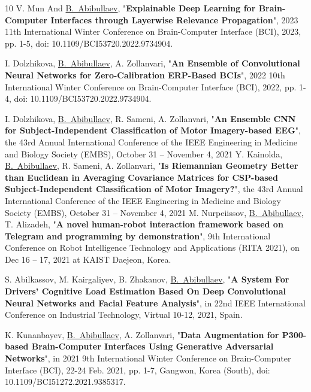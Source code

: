 \documentclass[10pt,letterpaper,sans]{moderncv}   %
\begin{document}
\renewcommand{\refname}{Conference proceedings}
\begin{thebibliography}{10}
	\small
	V. Mun And \underline{B.~Abibullaev}, "\textbf{Explainable Deep Learning for Brain-Computer Interfaces through Layerwise Relevance Propagation}", 2023 11th International Winter Conference on Brain-Computer Interface (BCI), 2023, pp. 1-5, doi: 10.1109/BCI53720.2022.9734904.
	
	
	\small
	I. Dolzhikova, \underline{B.~Abibullaev}, A. Zollanvari, "\textbf{An Ensemble of Convolutional Neural Networks for Zero-Calibration ERP-Based BCIs}", 2022 10th International Winter Conference on Brain-Computer Interface (BCI), 2022, pp. 1-4, doi: 10.1109/BCI53720.2022.9734904.
	
	\small
	I. Dolzhikova, \underline{B.~Abibullaev}, R. Sameni, A. Zollanvari, "\textbf{An Ensemble CNN for Subject-Independent Classification of Motor Imagery-based EEG}", the 43rd Annual International Conference of the IEEE Engineering in Medicine and Biology Society (EMBS), October 31 – November 4, 2021
	\small
	Y. Kainolda, \underline{B.~Abibullaev}, R. Sameni, A. Zollanvari, "\textbf{Is Riemannian Geometry Better than Euclidean in Averaging Covariance Matrices for CSP-based Subject-Independent Classification of Motor Imagery?}", the 43rd Annual International Conference of the IEEE Engineering in Medicine and Biology Society (EMBS), October 31 – November 4, 2021
	\small
	M. Nurpeiissov, \underline{B.~Abibullaev}, T. Alizadeh,  "\textbf{A novel human-robot interaction framework based on Telegram and programming by demonstration}", 9th International Conference on Robot Intelligence Technology and Applications (RITA 2021), on Dec 16 -- 17, 2021 at KAIST Daejeon, Korea.
	
	\small
	S. Abilkassov, M. Kairgaliyev, B. Zhakanov, \underline{B.~Abibullaev}, 
	"\textbf{A System For Drivers' Cognitive Load Estimation Based On Deep Convolutional Neural Networks and Facial Feature Analysis}", in 22nd IEEE International Conference on Industrial Technology, Virtual 10-12, 2021, Spain.
	
	\small
	K. Kunanbayev, \underline{B.~Abibullaev}, A. Zollanvari, "\textbf{Data Augmentation for P300-based Brain-Computer Interfaces Using Generative Adversarial Networks}", in 2021 9th International Winter Conference on Brain-Computer Interface (BCI), 22-24 Feb. 2021, pp. 1-7, Gangwon, Korea (South), doi: 10.1109/BCI51272.2021.9385317.
	

\end{thebibliography}
\end{document}

